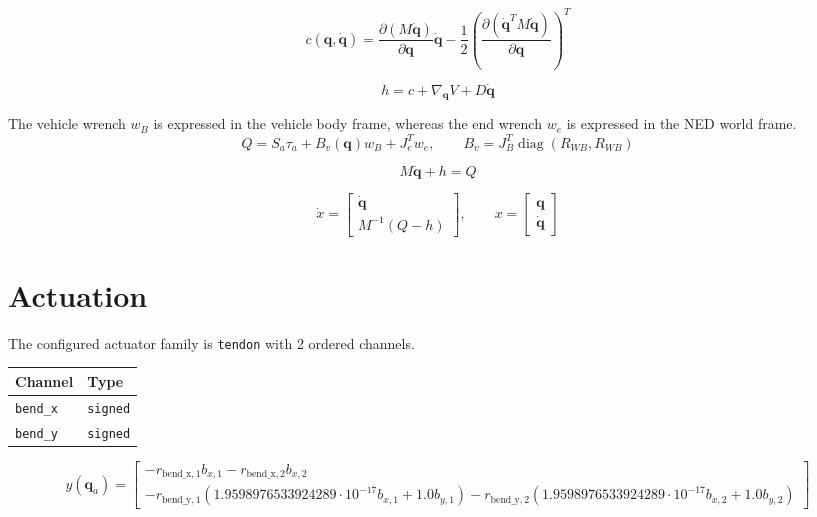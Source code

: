 \documentclass[11pt]{article}
\begin{document}
\begin{equation}
c(\boldsymbol q,\dot{\boldsymbol q})=\frac{\partial(M\dot{\boldsymbol q})}{\partial\boldsymbol q}\dot{\boldsymbol q}-\frac12\left(\frac{\partial(\dot{\boldsymbol q}^{T}M\dot{\boldsymbol q})}{\partial\boldsymbol q}\right)^T
\end{equation}

\begin{equation}
h=c+\nabla_{\boldsymbol q}V+D\dot{\boldsymbol q}
\end{equation}

The vehicle wrench $w_B$ is expressed in the vehicle body frame, whereas the end wrench $w_e$ is expressed in the NED world frame.
\begin{equation}
Q=S_a\tau_a+B_v(\boldsymbol q)w_B+J_e^Tw_e,\qquad B_v=J_B^T\operatorname{diag}(R_{WB},R_{WB})
\end{equation}

\begin{equation}
M\ddot{\boldsymbol q}+h=Q\label{eq:dynamics}
\end{equation}

\begin{equation}
\dot x=\begin{bmatrix}\dot{\boldsymbol q}\\M^{-1}(Q-h)\end{bmatrix},\qquad x=\begin{bmatrix}\boldsymbol q\\\dot{\boldsymbol q}\end{bmatrix}
\end{equation}


\section{Actuation}
The configured actuator family is \texttt{tendon} with 2 ordered channels.
\begin{center}
\begin{tabular}{ll}
\hline
Channel & Type \\
\hline
\texttt{bend\_x} & \texttt{signed} \\
\texttt{bend\_y} & \texttt{signed} \\
\hline
\end{tabular}
\end{center}
\begin{equation}
y(\boldsymbol q_a)=\begin{bmatrix}- r_{\mathrm{bend\_x},1} b_{x,1} - r_{\mathrm{bend\_x},2} b_{x,2}\\- r_{\mathrm{bend\_y},1} \left(1.9598976533924289 \cdot 10^{-17} b_{x,1} + 1.0 b_{y,1}\right) - r_{\mathrm{bend\_y},2} \left(1.9598976533924289 \cdot 10^{-17} b_{x,2} + 1.0 b_{y,2}\right)\end{bmatrix}
\end{equation}
\end{document}
